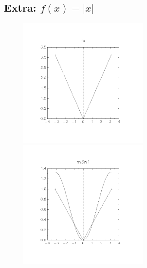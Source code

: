 \documentclass[11pt, a4paper, titlepage, openright]{article}
\begin{document}
    \bigskip
    \bigskip
    \bigskip
    \bigskip
	\subsection{Extra: \( f(x) = |x| \)}
	\label{sec:absImages}
    \begin{figure}[H]
        \begin{minipage}[b]{0.49\textwidth}
            \includegraphics[width=6.5cm, trim={2cm, 4cm, 2cm, 3cm}, clip]{../absImages/fx}
        \end{minipage}
        \hfill
        \begin{minipage}[b]{0.49\textwidth}
            \includegraphics[width=6.5cm, trim={2cm, 4cm, 2cm, 3cm}, clip]{../absImages/m3n1}
        \end{minipage}
    \end{figure}
\end{document}
